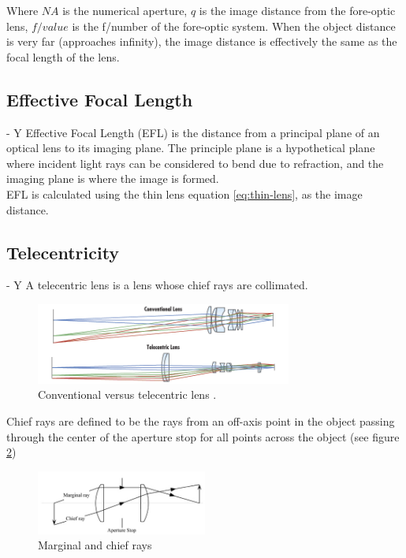 Where $NA$ is the numerical aperture, $q$ is the image distance from the fore-optic lens, $f/value$ is the f/number of the fore-optic system. When the object distance is very far (approaches infinity), the image distance is effectively the same as the focal length of the lens.

\subsection{Effective Focal Length} - Y
Effective Focal Length (EFL) is the distance from a principal plane of an optical lens to its imaging plane. The principle plane is a hypothetical plane where incident light rays can be considered to bend due to refraction, and the imaging plane is where the image is formed\cite{Edmund_lens_geometries}.\\
EFL is calculated using the thin lens equation \ref{eq:thin-lens}, as the image distance.

\subsection{Telecentricity} - Y 
A telecentric lens is a lens whose chief rays are collimated. 

\begin{figure}[H]
\centering
\includegraphics[width=0.75\textwidth]{figures/conventional-vs-telecentric-lens.png}
\caption{Conventional versus telecentric lens \cite{noauthor_undated-du}.}
\label{fig:conventional-vs-telecentric-lens}
\end{figure}


Chief rays are defined to be the rays from an off-axis point in the object passing through the center of the aperture stop for all points across the object (see figure \ref{fig:marginal-and-chief-rays})

\begin{figure}[H]
\centering
\includegraphics[width=0.5\textwidth]{figures/marginal-and-chief-rays.png}
\caption{Marginal and chief rays \cite{noauthor_undated-cw}}
\label{fig:marginal-and-chief-rays}
\end{figure}
 
